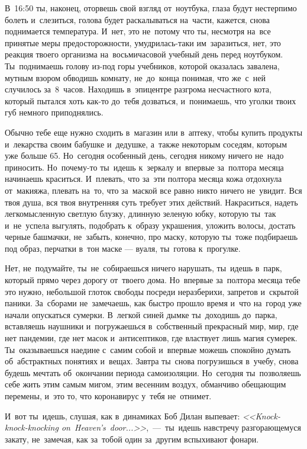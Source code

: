 В~16:50 ты, наконец, оторвешь свой взгляд от~ноутбука, глаза будут нестерпимо болеть и~слезиться, голова будет раскалываться на~части, кажется, снова поднимается температура.
И~нет, это не~потому что ты, несмотря на~все принятые меры предосторожности, умудрилась-таки им~заразиться, нет, это реакция твоего организма на~восьмичасовой учебный день перед ноутбуком.
Ты~поднимаешь голову из-под горы учебников, которой оказалась завалена, мутным взором обводишь комнату, не~до~конца понимая, что же~с~ней случилось за~8~часов.
Находишь в~эпицентре разгрома несчастного кота, который пытался хоть как-то до~тебя дозваться, и~понимаешь, что уголки твоих губ немного приподнялись.

Обычно тебе еще нужно сходить в~магазин или в~аптеку, чтобы купить продукты и~лекарства своим бабушке и~дедушке, а~также некоторым соседям, которым уже больше 65.
Но~сегодня особенный день, сегодня никому ничего не~надо приносить.
Но~почему-то ты~идешь к~зеркалу и~впервые за~полтора месяца начинаешь краситься.
И~плевать, что за~эти полтора месяца кожа отдохнула от~макияжа, плевать на~то, что за~маской все равно никто ничего не~увидит.
Вся твоя душа, вся твоя внутренняя суть требует этих действий.
Накраситься, надеть легкомысленную светлую блузку, длинную зеленую юбку, которую ты~так и~не~успела выгулять, подобрать к~образу украшения, уложить волосы, достать черные башмачки, не~забыть, конечно, про маску, которую ты~тоже подбираешь под образ, перчатки в~тон маске --- вуаля, ты~готова к~прогулке.

Нет, не~подумайте, ты~не~собираешься ничего нарушать, ты~идешь в~парк, который прямо через дорогу от~твоего дома.
Но~впервые за~полтора месяца тебе это нужно, небольшой глоток свободы посреди неразберихи, запретов и~скрытой паники.
За~сборами не~замечаешь, как быстро прошло время и~что на~город уже начали опускаться сумерки.
В~легкой синей дымке ты~доходишь до~парка, вставляешь наушники и~погружаешься в~собственный прекрасный мир, мир, где нет пандемии, где нет масок и~антисептиков, где властвует лишь магия сумерек.
Ты~оказываешься наедине с~самим собой и~впервые можешь спокойно думать об~абстрактных понятиях и~вещах.
Завтра ты~снова погрузишься в~учебу, снова будешь мечтать об~окончании периода самоизоляции.
Но~сегодня ты~позволяешь себе жить этим самым мигом, этим весенним воздух, обманчиво обещающим перемены, и~это то, что коронавирус у~тебя не~отнимет.

И~вот ты~идешь, слушая, как в~динамиках Боб Дилан выпевает: \textit{<<Knock-knock-knocking on~Heaven's~door...>>},~---~ты~идешь навстречу разгорающемуся закату, не~замечая, как за~тобой один за~другим вспыхивают фонари.
